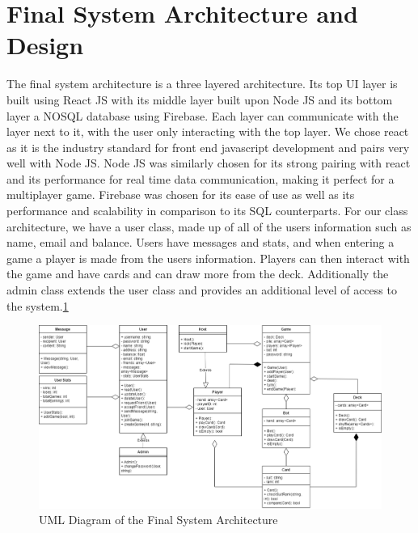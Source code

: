 \section{Final System Architecture and Design}

The final system architecture is a three layered architecture. Its top UI layer is built using React JS with its middle layer built upon Node JS and its bottom layer a NOSQL database using Firebase. Each layer can communicate with the layer next to it, with the user only interacting with the top layer. We chose react as it is the industry standard for front end javascript development and pairs very well with Node JS. Node JS was similarly chosen for its strong pairing with react and its performance for real time data communication, making it perfect for a multiplayer game. Firebase was chosen for its ease of use as well as its performance and scalability in comparison to its SQL counterparts. For our class architecture, we have a user class, made up of all of the users information such as name, email and balance. Users have messages and stats, and when entering a game a player is made from the users information. Players can then interact with the game and have cards and can draw more from the deck. Additionally the admin class extends the user class and provides an additional level of access to the system.\ref{fig:uml_diagram}


\begin{figure}[H]
    \centering
    \includegraphics[width=\textwidth]{Crazy8sUML.png}
    \caption{UML Diagram of the Final System Architecture}
    \label{fig:uml_diagram}
\end{figure}